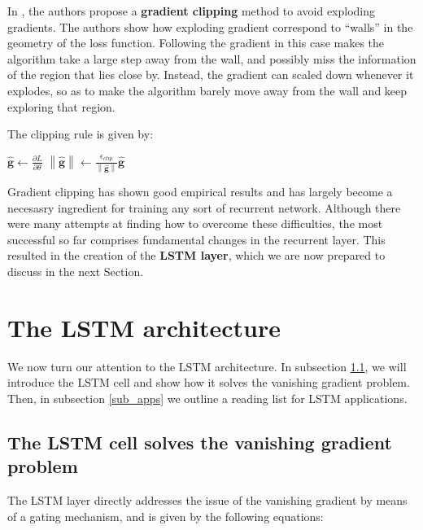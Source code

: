 \documentclass[pdftex,11pt,a4paper]{article}
\theoremstyle{definition}
\theoremstyle{remark}
\newcommand*{\V}[1]{\mathbf{#1}}%
\newcommand{\norm}[1]{\left\lVert#1\right\rVert}
\newcommand{\parder}[2]{\frac{\partial{#1}}{\partial{#2}}}
\begin{document}
\par In \cite{Pascanu2012}, the authors propose a \textbf{gradient clipping} method to avoid exploding gradients. The authors show how exploding gradient correspond to ``walls'' in the geometry of the loss function. Following the gradient in this case makes the algorithm take a large step away from the wall, and possibly miss the information of the region that lies close by. Instead, the gradient can scaled down whenever it explodes, so as to make the algorithm barely move away from the wall and keep exploring that region. 

\par The clipping rule is given by:
\begin{algorithm}
\begin{algorithmic}[1]
\State $\hat{\V{g}} \leftarrow \parder{L}{\theta}$
\If{$\norm{\hat{\V{g}}} \geq \epsilon_{\text{clip}}$}
\State $\norm{\hat{\V{g}}}\leftarrow \frac{\epsilon_{clip}}{\norm{\hat{\V{g}}}}\hat{\V{g}}$
\EndIf
\EndFunction
\end{algorithmic}
\end{algorithm}

\par Gradient clipping has shown good empirical results and has largely become a necesasry ingredient for training any sort of recurrent network. Although there were many attempts at finding how to overcome these difficulties, the most successful so far comprises fundamental changes in the recurrent layer. This resulted in the creation of the \textbf{LSTM layer}, which we are now prepared to discuss in the next Section.

\section{The LSTM architecture} \label{sec_lstm}

We now turn our attention to the LSTM architecture. In subsection \ref{sub_lstm}, we will introduce the LSTM cell and show how it solves the vanishing gradient problem. Then, in subsection \ref{sub_apps} we outline a reading list for LSTM applications. 

\subsection{The LSTM cell solves the vanishing gradient problem} \label{sub_lstm}
The LSTM layer \cite{Gers2002,Hochreiter1997} directly addresses the issue of the vanishing gradient by means of a gating mechanism, and is given by the following equations:
\end{document}
